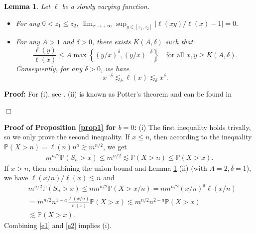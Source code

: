 \documentclass[10pt,a4paper]{amsart}
\newtheorem{lemma}[thrm]{Lemma}
\numberwithin{equation}{section}
\begin{document}
	\begin{lemma}\label{lem-useful-fact}
		Let $\ell$ be a slowly varying function.
		
		\begin{itemize}
			\item[(i)] For any $0<z_1\leq z_2$, 
			$
			\lim_{x \to +\infty} \sup_{ y\in [z_1, z_2]} \big|  \ell(xy)/\ell(x) - 1\big| =0.
			$
			
			\item[(ii)] For any $A > 1$ and $\delta > 0$, there exists $K(A, \delta)$ such that
			\[
			\frac{\ell(y)}{\ell(x)} \leq A \max\left\{(y/x)^\delta, (y/x)^{-\delta}\right\} \quad \text{for all } x, y \geq K(A, \delta).
			\]
			Consequently, for any $\delta > 0$, we have
			\[
			x^{-\delta} \lesssim_\delta \ell(x) \lesssim_\delta x^{\delta}.
			\]
		\end{itemize}
	\end{lemma}
	\textbf{Proof: }  For (i), see \cite[Theorem 1.5.2, p.22]{BGT1987}. (ii) is known as Potter's theorem and can be found in \cite[Theorem 1.5.6, p.25]{BGT1987}
	
	
	\hfill$\Box$
	

\noindent
\textbf{Proof of Proposition \ref{prop1} for $b=0$:}  (i) The first inequality holds trivally, so we only prove the second inequality. 
If $x\leq n$, then according to the inequality $\mathbb{P}(X>n)= \ell(n)n^a\gtrsim m^{n/2}$, we get 
\begin{align}\label{e1}
	m^{n/2} \mathbb{P}\left(S_n>x\right)\leq m^{n/2}\lesssim   \mathbb{P}(X>n)\leq   \mathbb{P}(X>x). 
\end{align}
If $x>n$, then combining the union bound and Lemma \ref{lem-useful-fact} (ii) (with $A=2, \delta=1$),  we have $\ell(x/n)/\ell(x)\lesssim n$ and 
\begin{align} \label{e2}
	& m^{n/2}  \mathbb{P}\left(S_n> x \right)  \leq nm^{n/2}  \mathbb{P}(X>x/n) = nm^{n/2} (x/n)^a \ell(x/n) \nonumber\\
	&= m^{n/2} n^{1-a} \frac{\ell(x/n)}{\ell(x)} \mathbb{P}(X>x) \lesssim m^{n/2} n^{2-a} \mathbb{P}(X>x) \nonumber\\
	&\lesssim \mathbb{P}(X>x) .
\end{align}
Combining \eqref{e1} and \eqref{e2} implies (i).
\end{document}
